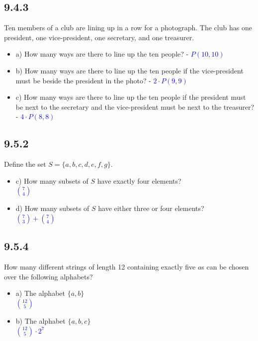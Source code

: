 \documentclass{article}
\begin{document}
\subsection*{9.4.3} Ten members of a club are lining up in a row for a photograph. The club has one president, one vice-president, one secretary, and one treasurer.
\begin{itemize}
    \item a) How many ways are there to line up the ten people? - 
    \textcolor{blue}{$P(10,10)$}
    \item b) How many ways are there to line up the ten people if the vice-president must be beside the president in the photo? -
    \textcolor{blue}{$2 \cdot P(9,9)$}
    \item c) How many ways are there to line up the ten people if the president must be next to the secretary and the vice-president must be next to the treasurer? -
    \textcolor{blue}{$4 \cdot P(8,8)$}
\end{itemize}

\subsection*{9.5.2} Define the set $S = \{a, b, c, d, e, f, g\}$.
\begin{itemize}
    \item c) How many subsets of $S$ have exactly four elements? \\
    \textcolor{blue}{$\binom{7}{4}$}
    \item d) How many subsets of $S$ have either three or four elements? \\
    \textcolor{blue}{$\binom{7}{3} + \binom{7}{4}$}
\end{itemize}

\subsection*{9.5.4} How many different strings of length 12 containing exactly five $a$s can be chosen over the following alphabets?
\begin{itemize}
    \item a) The alphabet $\{a, b\}$ \\
    \textcolor{blue}{$\binom{12}{5}$}
    \item b) The alphabet $\{a, b, c\}$ \\
    \textcolor{blue}{$\binom{12}{5} \cdot 2^7$}
\end{itemize}
\end{document}

